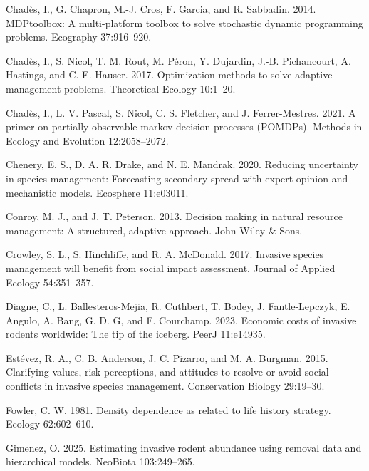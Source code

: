 \documentclass[
  11pt,
  a4paper,
]{article}
\newlength{\cslhangindent}
\newenvironment{CSLReferences}[2] %
 {\begin{list}{}{%
  \setlength{\itemindent}{0pt}
  \setlength{\leftmargin}{0pt}
  \setlength{\parsep}{0pt}
  \ifodd #1
   \setlength{\leftmargin}{\cslhangindent}
   \setlength{\itemindent}{-1\cslhangindent}
  \fi
  \setlength{\itemsep}{#2\baselineskip}}}
 {\end{list}}
\begin{document}
\begin{CSLReferences}{1}{0}
Chadès, I., G. Chapron, M.-J. Cros, F. Garcia, and R. Sabbadin. 2014. MDPtoolbox: A multi-platform toolbox to solve stochastic dynamic programming problems. Ecography 37:916--920.

Chadès, I., S. Nicol, T. M. Rout, M. Péron, Y. Dujardin, J.-B. Pichancourt, A. Hastings, and C. E. Hauser. 2017. Optimization methods to solve adaptive management problems. Theoretical Ecology 10:1--20.

Chadès, I., L. V. Pascal, S. Nicol, C. S. Fletcher, and J. Ferrer-Mestres. 2021. A primer on partially observable markov decision processes (POMDPs). Methods in Ecology and Evolution 12:2058--2072.

Chenery, E. S., D. A. R. Drake, and N. E. Mandrak. 2020. Reducing uncertainty in species management: Forecasting secondary spread with expert opinion and mechanistic models. Ecosphere 11:e03011.

Conroy, M. J., and J. T. Peterson. 2013. Decision making in natural resource management: A structured, adaptive approach. John Wiley \& Sons.

Crowley, S. L., S. Hinchliffe, and R. A. McDonald. 2017. Invasive species management will benefit from social impact assessment. Journal of Applied Ecology 54:351--357.

Diagne, C., L. Ballesteros-Mejia, R. Cuthbert, T. Bodey, J. Fantle-Lepczyk, E. Angulo, A. Bang, G. D. G, and F. Courchamp. 2023. Economic costs of invasive rodents worldwide: The tip of the iceberg. PeerJ 11:e14935.

Estévez, R. A., C. B. Anderson, J. C. Pizarro, and M. A. Burgman. 2015. {Clarifying values, risk perceptions, and attitudes to resolve or avoid social conflicts in invasive species management}. Conservation Biology 29:19--30.

Fowler, C. W. 1981. Density dependence as related to life history strategy. Ecology 62:602--610.

Gimenez, O. 2025. Estimating invasive rodent abundance using removal data and hierarchical models. NeoBiota 103:249--265.


\end{CSLReferences}
\end{document}
